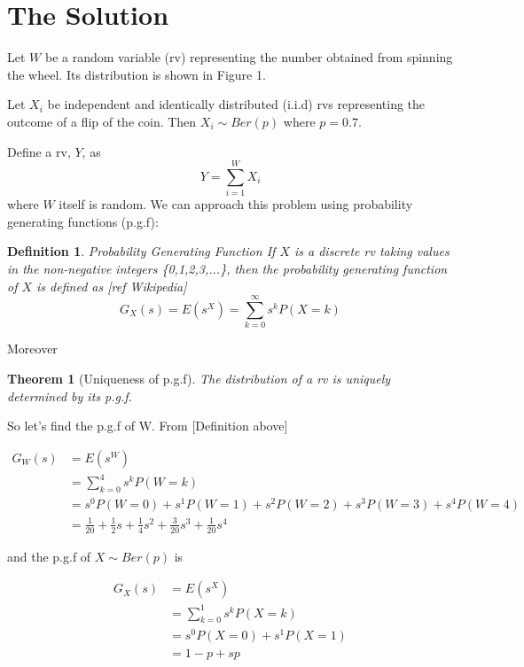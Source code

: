 \documentclass{article}
\newtheorem{definition}{Definition}[section]
\newtheorem{theorem}{Theorem}[section]
\begin{document}
\section{The Solution} %

\begin{flushleft}
Let $W$ be a random variable (rv) representing the number obtained from spinning the wheel. Its distribution is shown in Figure 1. \newline

Let $X_i$ be independent and identically distributed (i.i.d) rvs representing the outcome of a flip of the coin. Then $X_i \sim Ber(p)$ where $p=0.7$.\newline

Define a rv, $Y$, as
$$Y = \sum_{i=1}^W X_i$$
where $W$ itself is random. We can approach this problem using probability generating functions (p.g.f):\newline

\begin{definition}{Probability Generating Function}
If $X$ is a discrete rv taking values in the non-negative integers \{0,1,2,3,...\}, then the probability generating function of $X$ is defined as [ref Wikipedia]
$$G_X(s) = E(s^X) = \sum_{k=0}^{\infty} s^k P(X=k)$$
\end{definition}

Moreover

\begin{theorem}[Uniqueness of p.g.f]
The distribution of a rv is uniquely determined by its p.g.f.
\end{theorem}

So let's find the p.g.f of W. From [Definition above]

\begin{equation} \label{eq1}
\begin{split}
G_W(s) & = E(s^W) \\
& = \sum_{k=0}^4 s^k P(W=k) \\
& = s^0 P(W=0) + s^1 P(W=1) + s^2 P(W=2) + s^3 P(W=3) + s^4 P(W=4) \\
& = \frac{1}{20} + \frac{1}{2}s + \frac{1}{4}s^2 + \frac{3}{20}s^3 + \frac{1}{20}s^4
\end{split}
\end{equation}

and the p.g.f of $X \sim Ber(p)$ is

\begin{equation} \label{eq1}
\begin{split}
G_X(s) & = E(s^X) \\
& = \sum_{k=0}^1 s^k P(X=k) \\
& = s^0 P(X=0) + s^1 P(X=1)\\
& = 1-p + sp
\end{split}
\end{equation}


\end{flushleft}
\end{document}
